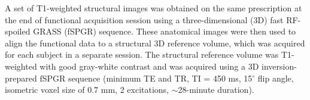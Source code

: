 \documentclass[5p,authoryear]{elsarticle}
\begin{document}
A set of T1-weighted structural images was obtained on the same prescription at the end of functional acquisition session using a three-dimensional (3D) fast RF-spoiled GRASS (fSPGR) sequence. 
These anatomical images were then used to align the functional data to a structural 3D reference volume, which was acquired for each subject in a separate session. 
The structural reference volume was T1-weighted with good gray-white contrast and was acquired using a 3D inversion-prepared fSPGR sequence (minimum TE and TR, TI = 450 ms, 15$^\circ$ flip angle, isometric voxel size of 0.7 mm, 2 excitations, $\sim$28-minute duration).

\end{document}
